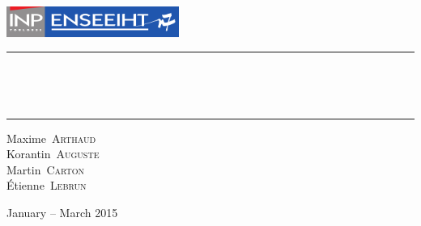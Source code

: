 \begin{titlepage}
  \begin{center}
    \includegraphics[height=1cm]{LogoEnseeiht}\\\vspace{1cm}
    \hrule\vspace{0.5cm}
    \textsc{\Large\thesubtitle}
    \\\vspace{0.5cm}

    \textbf{\huge\thetitle}
    \\\vspace{0.4cm}
    \hrule\vspace{2cm}

    {\large
      Maxime~\textsc{Arthaud}      \\
      Korantin~\textsc{Auguste}    \\
      Martin~\textsc{Carton}       \\
      Étienne~\textsc{Lebrun}
    }

    \vfill
    {\large January -- March 2015}
  \end{center}
\end{titlepage}
